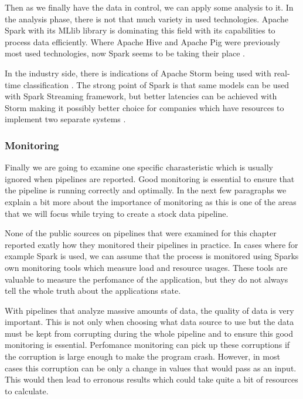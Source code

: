 Then as we finally have the data in control, we can apply some analysis to it.
In the analysis phase, there is not that much variety in used technologies.
Apache Spark with its MLlib library is dominating this field with its capabilities to process data efficiently. \cite{islam} \cite{chen} \cite{chungho} \cite{adresic}
Where Apache Hive and Apache Pig were previously most used technologies, now Spark seems to be taking their place \cite{snively}.

In the industry side, there is indications of Apache Storm being used with real-time classification \cite{juan}.
The strong point of Spark is that same models can be used with Spark Streaming framework, but better latencies can be achieved with Storm making it possibly better choice for companies which have resources to implement two separate systems \cite{kumar}.

\subsubsection{Monitoring}

Finally we are going to examine one specific charasteristic which is usually ignored when pipelines are reported.
Good monitoring is essential to ensure that the pipeline is running correctly and optimally.
In the next few paragraphs we explain a bit more about the importance of monitoring as this is one of the areas that we will focus while trying to create a stock data pipeline.

None of the public sources on pipelines that were examined for this chapter reported exatly how they monitored their pipelines in practice.
In cases where for example Spark is used, we can assume that the process is monitored using Sparks own monitoring tools which measure load and resource usages.
These tools are valuable to measure the perfomance of the application, but they do not always tell the whole truth about the applications state.

With pipelines that analyze massive amounts of data, the quality of data is very important.
This is not only when choosing what data source to use but the data must be kept from corrupting during the whole pipeline and to ensure this good monitoring is essential.
Perfomance monitoring can pick up these corruptions if the corruption is large enough to make the program crash.
However, in most cases this corruption can be only a change in values that would pass as an input.
This would then lead to erronous results which could take quite a bit of resources to calculate.

